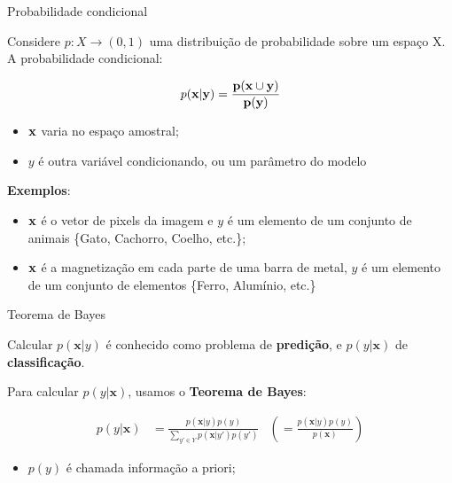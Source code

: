 \documentclass{beamer}
\begin{document}
\begin{frame}{Probabilidade condicional}

   Considere $p:X \to (0,1)$ uma distribuição de probabilidade sobre um espaço X. A probabilidade condicional: 

   \begin{equation}
       p(\bf{x}|y) = \frac{p(\bf{x}\cup y)}{p(y)}
   \end{equation}

   \begin{itemize}
       \item $\bf{x}$ varia no espaço amostral;
       \item $y$ é outra variável condicionando, ou um parâmetro do modelo
   \end{itemize}
   
   \pause

   \textbf{Exemplos}:

   \begin{itemize}
       \item $\bf x$ é o vetor de pixels da imagem e $y$ é um elemento de um conjunto de animais \{Gato, Cachorro, Coelho, etc.\};
       \item $\bf x$ é a magnetização em cada parte de uma barra de metal, $y$ é um elemento de um conjunto de elementos \{Ferro, Alumínio, etc.\}
   \end{itemize}

\end{frame}

\begin{frame}{Teorema de Bayes}
   
   Calcular $p(\mathbf{x}|y)$ é conhecido como problema de \textbf{predição}, e $p(y|\mathbf x)$ de \textbf{classificação}.
   \vspace{1em}

   \pause
   
   Para calcular $p(y| \mathbf x)$, usamos o \textbf{Teorema de Bayes}:

   \begin{align*}
       p(y|\mathbf x) &= \frac{p(\mathbf{x}|y)p(y)}{\sum_{y' \in Y}p(\mathbf{x}|y')p(y')}
       &\left( = \frac{p(\mathbf{x}|y)p(y)}{p(\mathbf{x})} \right)
   \end{align*}
   

   \begin{itemize}
       \item $p(y)$ é chamada informação a priori;
   \end{itemize}
\end{frame}
\end{document}
